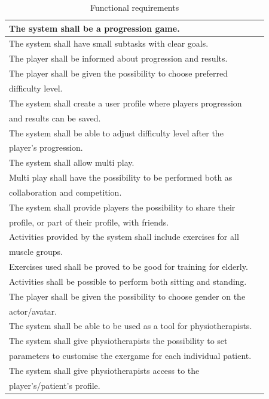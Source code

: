 \begin{table} [H]
\label{tab:func2}
\centering
    \begin{tabular}{|l|l|}
       \hline
	   The system shall be a progression game.\\ \hline
	   The system shall have small subtasks with clear goals.\\ \hline
	   The player shall be informed about progression and results.\\ \hline
	   The player shall be given the possibility to choose preferred \\ difficulty level.\\ \hline
	   The system shall create a user profile where players progression \\ and results can be saved.\\ \hline
	   The system shall be able to adjust difficulty level after the \\ player's progression.\\ \hline
	   The system shall allow multi play.\\ \hline
	   Multi play shall have the possibility to be performed both as \\ collaboration and competition.\\ \hline
	   The system shall provide players the possibility to share their \\ profile, or part of their profile, with friends. \\ \hline
	   Activities provided by the system shall include exercises for all \\ muscle groups.\\ \hline
	   Exercises used shall be proved to be good for training for elderly.\\ \hline
	   Activities shall be possible to perform both sitting and standing. \\ \hline
	   The player shall be given the possibility to choose gender on the \\ actor/avatar. \\ \hline
	   The system shall be able to be used as a tool for physiotherapists.\\ \hline
	   The system shall give physiotherapists the possibility to set \\ parameters to customise the exergame for each individual patient.\\ \hline
	   The system shall give physiotherapists access to the \\ player's/patient's profile. \\ \hline  
    \end{tabular}
    \caption[Functional requirements]{Functional requirements}
    \label{tab:agenda}
\end{table} 


